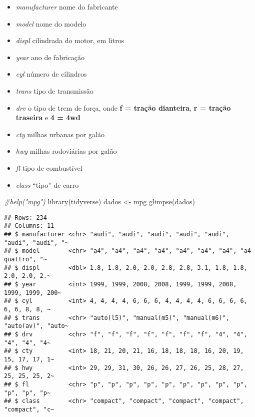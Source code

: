 \documentclass[
]{book}
\newenvironment{Shaded}{\begin{snugshade}}{\end{snugshade}}
\newcommand{\CommentTok}[1]{\textcolor[rgb]{0.56,0.35,0.01}{\textit{#1}}}
\newcommand{\FunctionTok}[1]{\textcolor[rgb]{0.00,0.00,0.00}{#1}}
\newcommand{\NormalTok}[1]{#1}
\newcommand{\OtherTok}[1]{\textcolor[rgb]{0.56,0.35,0.01}{#1}}
\begin{document}
\begin{itemize}
\item
  \emph{manufacturer} nome do fabricante
\item
  \emph{model} nome do modelo
\item
  \emph{displ} cilindrada do motor, em litros
\item
  \emph{year} ano de fabricação
\item
  \emph{cyl} número de cilindros
\item
  \emph{trans} tipo de transmissão
\item
  \emph{drv} o tipo de trem de força, onde \textbf{f = tração dianteira}, \textbf{r = tração traseira} e \textbf{4 = 4wd}
\item
  \emph{cty} milhas urbanas por galão
\item
  \emph{hwy} milhas rodoviárias por galão
\item
  \emph{fl} tipo de combustível
\item
  \emph{class} ``tipo'' de carro
\end{itemize}

\begin{Shaded}
\begin{Highlighting}[]
\CommentTok{\#help("mpg")}
\FunctionTok{library}\NormalTok{(tidyverse)}
\NormalTok{dados }\OtherTok{\textless{}{-}}\NormalTok{ mpg}
\FunctionTok{glimpse}\NormalTok{(dados)}
\end{Highlighting}
\end{Shaded}

\begin{verbatim}
## Rows: 234
## Columns: 11
## $ manufacturer <chr> "audi", "audi", "audi", "audi", "audi", "audi", "audi", "~
## $ model        <chr> "a4", "a4", "a4", "a4", "a4", "a4", "a4", "a4 quattro", "~
## $ displ        <dbl> 1.8, 1.8, 2.0, 2.0, 2.8, 2.8, 3.1, 1.8, 1.8, 2.0, 2.0, 2.~
## $ year         <int> 1999, 1999, 2008, 2008, 1999, 1999, 2008, 1999, 1999, 200~
## $ cyl          <int> 4, 4, 4, 4, 6, 6, 6, 4, 4, 4, 4, 6, 6, 6, 6, 6, 6, 8, 8, ~
## $ trans        <chr> "auto(l5)", "manual(m5)", "manual(m6)", "auto(av)", "auto~
## $ drv          <chr> "f", "f", "f", "f", "f", "f", "f", "4", "4", "4", "4", "4~
## $ cty          <int> 18, 21, 20, 21, 16, 18, 18, 18, 16, 20, 19, 15, 17, 17, 1~
## $ hwy          <int> 29, 29, 31, 30, 26, 26, 27, 26, 25, 28, 27, 25, 25, 25, 2~
## $ fl           <chr> "p", "p", "p", "p", "p", "p", "p", "p", "p", "p", "p", "p~
## $ class        <chr> "compact", "compact", "compact", "compact", "compact", "c~
\end{verbatim}
\end{document}
